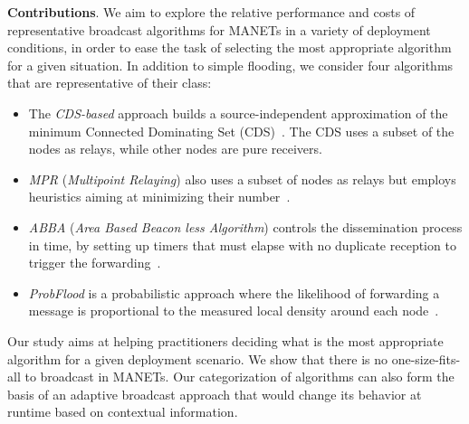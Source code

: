 \noindent
\textbf{Contributions}.
%
We aim to explore the relative performance and costs of representative broadcast algorithms for MANETs in a variety of deployment conditions, in order to ease the task of selecting the most appropriate algorithm for a given situation.
%
In addition to simple flooding, we consider four algorithms that are representative of their class:
\begin{itemize}
	\item The \emph{CDS-based} approach builds a source-independent approximation of the minimum Connected Dominating Set (CDS)~\cite{Wu2001}.
	The CDS uses a subset of the nodes as relays, while other nodes are pure receivers.
	
	
	\item
	\emph{MPR} (\textit{Multipoint Relaying}) also uses a subset of nodes as relays but employs heuristics aiming at minimizing their number~\cite{Qayyum2002}.
	
	\item \emph{ABBA} (\textit{Area Based Beacon less Algorithm}) controls the dissemination process in time, by setting up timers that must elapse with no duplicate reception to trigger the forwarding~\cite{Ovalle-Martinez2006}.

	\item \emph{ProbFlood} is a probabilistic approach where the likelihood of forwarding a message is proportional to the measured local density around each node~\cite{Cartigny:2003:BNR:2727141.2727459}.
\end{itemize}

Our study aims at helping practitioners deciding what is the most appropriate algorithm for a given deployment scenario.
%
We show that there is no one-size-fits-all to broadcast in MANETs.
%
%
Our categorization of algorithms can also form the basis of an adaptive broadcast approach that would change its behavior at runtime based on contextual information.
%

